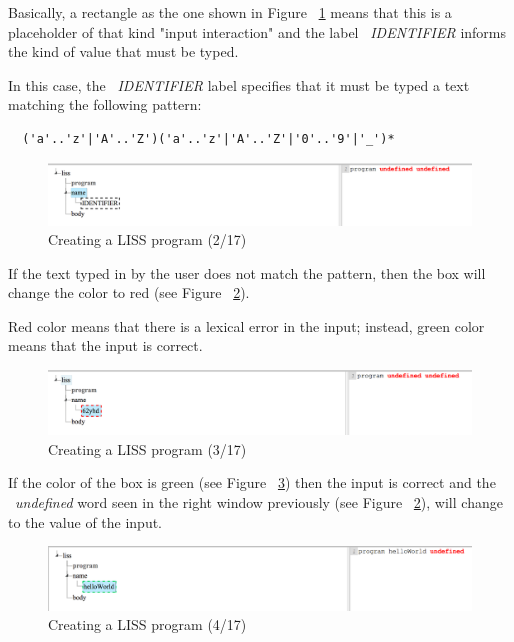 \documentclass[
  oneside,
  11pt, a4paper,
  footinclude=true,
  headinclude=true,
  cleardoublepage=empty
]{scrbook}
\begin{document}
Basically, a rectangle as the one shown in Figure ~\ref{fig:LISS-SDE_example_2} means that this is a placeholder of that kind "input interaction" and the label ~\textit{IDENTIFIER} informs the kind of value that must be typed.

In this case, the ~\textit{IDENTIFIER} label specifies that it must be typed a text matching the following pattern:

\begin{lstlisting}
  ('a'..'z'|'A'..'Z')('a'..'z'|'A'..'Z'|'0'..'9'|'_')*
\end{lstlisting}

\begin{figure}[h!]
  \centering
    \includegraphics[width=1\textwidth]{img/LISS-SDE_creating_program/LISS-SDE2.png}
    \caption{Creating a LISS program (2/17)}
    \label{fig:LISS-SDE_example_2}
\end{figure}

If the text typed in by the user does not match the pattern, then the box will change the color to red (see Figure ~\ref{fig:LISS-SDE_example_3}).

Red color means that there is a lexical error in the input; instead, green color means that the input is correct.

\begin{figure}[h!]
  \centering
    \includegraphics[width=1\textwidth]{img/LISS-SDE_creating_program/LISS-SDE3.png}
    \caption{Creating a LISS program (3/17)}
    \label{fig:LISS-SDE_example_3}
\end{figure}

If the color of the box is green (see Figure ~\ref{fig:LISS-SDE_example_4}) then the input is correct and the ~\textit{undefined} word seen in the right window previously (see Figure ~\ref{fig:LISS-SDE_example_3}), will change to the value of the input.

\begin{figure}[h!]
  \centering
    \includegraphics[width=1\textwidth]{img/LISS-SDE_creating_program/LISS-SDE4.png}
    \caption{Creating a LISS program (4/17)}
    \label{fig:LISS-SDE_example_4}
\end{figure}
\end{document}
